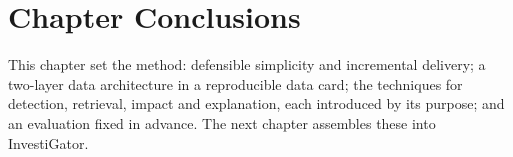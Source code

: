 \section{Chapter Conclusions}
\label{sec:met_summary}

This chapter set the method: defensible simplicity and incremental delivery; a two-layer data architecture
in a reproducible data card; the techniques for detection, retrieval, impact and explanation, each
introduced by its purpose; and an evaluation fixed in advance. The next chapter assembles these into
InvestiGator.

